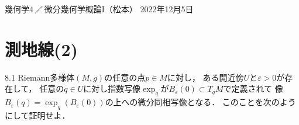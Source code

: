 \documentclass[uplatex,dvipdfmx,fontsize=12pt,jafontsize=11pt,line_length=42zw,number_of_lines=36,hanging_punctuation]{jlreq}
\begin{document}
\begin{flushleft}
	幾何学4\,／\,微分幾何学概論I（松本）
	\hfill
	2022年12月5日
\end{flushleft}
\setcounter{section}{7}
\section{測地線(2)}

\begin{enumerate-problems}
	\item[8.1]
		Riemann多様体$(M,g)$の任意の点$p\in M$に対し，
		ある開近傍$U$と$\varepsilon>0$が存在して，
		任意の$q\in U$に対し指数写像$\exp_q$が$B_\varepsilon(0)\subset T_qM$で定義されて
		像$B_\varepsilon(q)=\exp_q(B_\varepsilon(0))$の上への微分同相写像となる．
		このことを次のようにして証明せよ．


\end{enumerate-problems}
\end{document}

